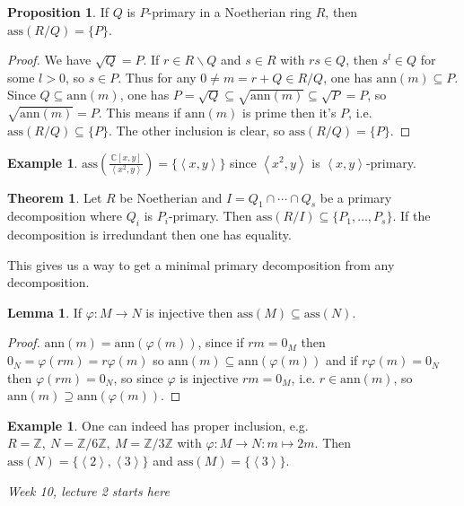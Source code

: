 \documentclass[a4paper]{article}
\newcommand{\la}{\left\langle}
\newcommand{\ra}{\right\rangle}
\newcommand{\Z}{\mathbb Z}
\newcommand{\C}{\mathbb C}
\newcommand{\ass}{\text{ass}}
\newcommand{\ann}{\text{ann}}
\theoremstyle{definition}
\newtheorem{prop}[defn]{Proposition}
\newtheorem{thm}[defn]{Theorem}
\newtheorem{lemma}[defn]{Lemma}
\newtheorem{example}[defn]{Example}
\begin{document}
\begin{prop}
\label{prop:assRQ=P}
If $Q$ is $P$-primary in a Noetherian ring $R$, then $\ass(R/Q)=\{P\}$.
\end{prop}
\begin{proof}
We have $\sqrt Q=P$. If $r\in R\backslash Q$ and $s\in R$ with $rs\in Q$, then $s^l\in Q$ for some $l>0$, so $s\in P$. Thus for any $0\neq m=r+Q\in R/Q$, one has $\ann(m)\subseteq P$. Since $Q\subseteq\ann(m)$, one has $P=\sqrt Q\subseteq \sqrt{\ann(m)}\subseteq \sqrt P=P$, so $\sqrt{\ann(m)}=P$. This means if $\ann(m)$ is prime then it's $P$, i.e. $\ass(R/Q)\subseteq\{P\}$. The other inclusion is clear, so $\ass(R/Q)=\{P\}$.
\end{proof}

\begin{example}
$\displaystyle \ass\left(\frac{\C[x,y]}{\la x^2,y\ra}\right)=\{\la x,y\ra\}$ since $\la x^2,y\ra$ is $\la x,y\ra$-primary.
\end{example}

\begin{thm}
Let $R$ be Noetherian and $I=Q_1\cap \cdots \cap Q_s$ be a primary decomposition where $Q_i$ is $P_i$-primary. Then $\ass(R/I)\subseteq\{P_1,\ldots,P_s\}$. If the decomposition is irredundant then one has equality.

This gives us a way to get a minimal primary decomposition from any decomposition.
\end{thm}

\begin{lemma}
\label{lemma:injthenasssubset}
If $\varphi:M\rightarrow N$ is injective then $\ass(M)\subseteq\ass(N)$.
\end{lemma}
\begin{proof}
$\ann(m)=\ann(\varphi(m))$, since if $rm=0_M$ then $0_N=\varphi(rm)=r\varphi(m)$ so $\ann(m)\subseteq \ann(\varphi(m))$ and if $r\varphi(m)=0_N$ then $\varphi(rm)=0_N$, so since $\varphi$ is injective $rm=0_M$, i.e. $r\in\ann(m)$, so $\ann(m)\supseteq \ann(\varphi(m))$.
\end{proof}
\begin{example}
One can indeed has proper inclusion, e.g. $R=\Z,\ N=\Z/6\Z,\ M=\Z/3\Z$ with $\varphi:M\rightarrow N:m\mapsto 2m$. Then $\ass(N)=\{\la 2\ra, \la 3\ra\}$ and $\ass(M)=\{\la 3\ra\}$.
\end{example}

\begin{flushright}
\textit{Week 10, lecture 2 starts here}
\end{flushright}
\end{document}
